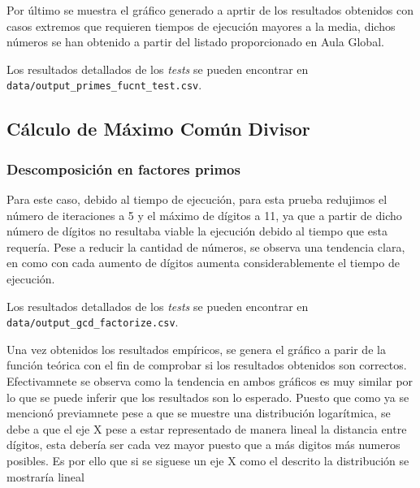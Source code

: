 Por último se muestra el gráfico generado a aprtir de los resultados obtenidos con casos extremos que requieren tiempos de ejecución mayores a la media, dichos números se han obtenido a partir del listado proporcionado en Aula Global.
\begin{figure}[H]
\end{figure}
Los resultados detallados de los \textit{tests} se pueden encontrar en \texttt{data/output\_primes\_fucnt\_test.csv}.



\subsection{Cálculo de Máximo Común Divisor}

\subsubsection{Descomposición en factores primos}
Para este caso, debido al tiempo de ejecución, para esta prueba redujimos el número de iteraciones a 5 y el máximo de dígitos a 11, ya que  a partir de dicho número de dígitos no resultaba viable la ejecución debido al tiempo que esta requería. Pese a reducir la cantidad de números, se observa una tendencia clara, en como con cada aumento de dígitos aumenta considerablemente el tiempo de ejecución.
\begin{figure}[H]
\end{figure}
Los resultados detallados de los \textit{tests} se pueden encontrar en \texttt{data/output\_gcd\_factorize.csv}.

Una vez obtenidos los resultados empíricos, se genera el gráfico a parir de la función teórica con el fin de comprobar si los resultados obtenidos son correctos. Efectivamnete se observa como la tendencia en ambos gráficos es muy similar por lo que se puede inferir que los resultados son lo esperado. Puesto que como ya se mencionó previamnete pese a que se muestre una distribución logarítmica, se debe a que el eje X pese a estar representado de manera lineal la distancia entre dígitos, esta debería ser cada vez mayor puesto que a más digitos más numeros posibles. Es por ello que si se siguese un eje X como el descrito la distribución se mostraría lineal
\begin{figure}[H]
\end{figure}



